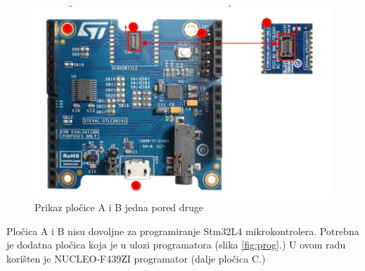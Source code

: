 \documentclass[times, utf8, diplomski]{diplomski}
\begin{document}
\begin{figure}[H]
\includegraphics[scale=0.5]{PlocicaAiB.png}
\centering
\caption{Prikaz pločice A i B jedna pored druge \cite{gettingstartedsensor}}
\label{fig:plocab}
\end{figure}

Pločica A i B nisu dovoljne za programiranje Stm32L4 mikrokontrolera. Potrebna je dodatna pločica koja je u ulozi programatora (slika \ref{fig:prog}.) U ovom radu korišten je NUCLEO-F439ZI programator
(dalje pločica C.)
\end{document}
